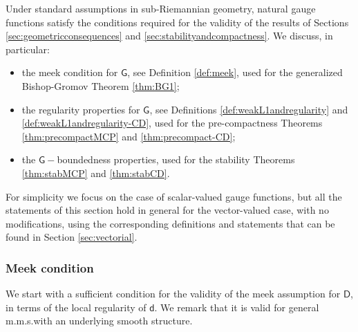 \documentclass[11pt,a4paper]{article}
\theoremstyle{plain}
\theoremstyle{definition}
\theoremstyle{remark}
\numberwithin{equation}{section}
\newcommand{\sfd}{\mathsf d}
\newcommand{\sfD}{\mathsf D}
\newcommand{\sfG}{\mathsf G}
\begin{document}
Under standard assumptions in sub-Rieman\-nian geometry, natural gauge functions satisfy the conditions required for the validity of the results of Sections \ref{sec:geometricconsequences} and \ref{sec:stabilityandcompactness}. We discuss, in particular:


\begin{itemize}
\item the meek condition for $\sfG$, see Definition \ref{def:meek}, used for the generalized Bishop-Gromov Theorem \ref{thm:BG1};
\item the regularity properties for $\sfG$, see Definitions \ref{def:weakL1andregularity} and \ref{def:weakL1andregularity-CD}, used for the pre-compactness Theorems \ref{thm:precompactMCP} and \ref{thm:precompact-CD};
\item the $\sfG-$boundedness properties, used for the stability Theorems \ref{thm:stabMCP} and \ref{thm:stabCD}.
\end{itemize}

For simplicity we focus on the case of scalar-valued gauge functions, but all the statements of this section hold in general for the vector-valued case, with no modifications, using the corresponding definitions and statements that can be found in Section \ref{sec:vectorial}. 


\subsubsection{Meek condition}\label{subsec:meek}

We start with a sufficient condition for the validity of the meek assumption for $\sfD$, in terms of the local regularity of $\sfd$. We remark that it is valid for general m.m.s.\@ with an underlying smooth structure.
\end{document}
